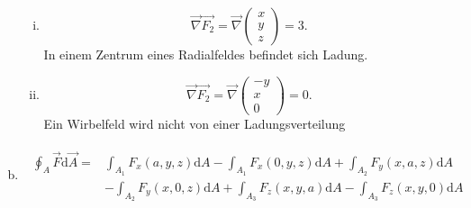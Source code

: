 \begin{enumerate}[(a)]
\begin{enumerate}[(i)]
\item
\begin{equation}
\vec{\nabla}  \vec{F_{2}} = \vec{\nabla}  \begin{pmatrix} x \\ y \\ z \end{pmatrix} = 3.
\end{equation}
In einem Zentrum eines Radialfeldes befindet sich Ladung.
\item
\begin{equation}
\vec{\nabla}  \vec{F_{2}} = \vec{\nabla}  \begin{pmatrix} -y \\ x \\ 0 \end{pmatrix} = 0.
\end{equation}
Ein Wirbelfeld wird nicht von einer Ladungsverteilung 
\end{enumerate}
\item 
\begin{align}
\begin{split}
\oint_A \vec{F}\mathrm{d}\vec{A} = &\int_{A_{1}} F_{x}(a,y,z)\mathrm{d}A - \int_{A_{1}} F_{x}(0,y,z)\mathrm{d}A + \int_{A_{2}} F_{y}(x,a,z)\mathrm{d}A \\ 
 &- \int_{A_{2}} F_{y}(x,0,z)\mathrm{d}A + \int_{A_{3}} F_{z}(x,y,a)\mathrm{d}A - \int_{A_{3}} F_{z}(x,y,0)\mathrm{d}A 
\end{split}
\end{align}

\end{enumerate}
